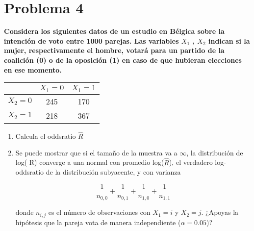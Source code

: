 \section*{Problema 4}

\textbf{Considera los siguientes datos de un estudio en Bélgica sobre la intención de voto entre 1000 parejas. Las variables $X_1$ , $X_2$ indican si la mujer, respectivamente el hombre, votará para un partido de la coalición (0) o de la oposición (1) en caso de que hubieran elecciones en ese momento.}

\begin{table}[H]
	\centering
	\begin{tabular}{c|cc}
		        & $X_1=0$ & $X_1=1$ \\  \hline
		$X_2=0$ & 245     & 170     \\
		$X_2=1$ & 218     & 367
	\end{tabular}
\end{table}

\begin{enumerate}
	\item Calcula el oddsratio $\hat{R}$
	\item Se puede mostrar que si el tamaño de la muestra va a $\infty$, la distribución de log( R̂) converge a una normal con promedio log($\hat{R}$), el verdadero log-oddsratio de la distribución subyacente, y con varianza

	      \begin{equation*}
		      \frac{1}{n_{0,0}} + \frac{1}{n_{0,1}} + \frac{1}{n_{1,0}} + \frac{1}{n_{1,1}}
	      \end{equation*}

	      donde $n_{i,j}$ es el número de  observaciones con $X_1=i$ y $X_2=j$. ¿Apoyas la hipótesis que la pareja vota de manera independiente ($\alpha=0.05$)?
\end{enumerate}
